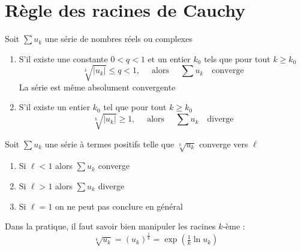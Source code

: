 \section{Règle des racines de Cauchy}

\begin{frame}
\begin{theoreme}
\pause
Soit $\sum u_k$ une série de nombres réels ou complexes
\begin{enumerate}
\item\pause S'il existe une constante $0<q<1$ et un entier $k_0$ tels que pour tout
$k \ge k_0$
$$
\sqrt[k]{|u_k|} \le q <1,\quad \text{ alors }\quad\sum u_k\quad \text{converge}
$$
\pause
La série est même absolument convergente
\item\pause S'il existe un entier $k_0$ tel que pour tout $k \ge k_0$
$$
\sqrt[k]{|u_k|} \ge 1,\quad \text{ alors }\quad\sum u_k \quad\text{diverge}
$$
\end{enumerate}
\end{theoreme}
\end{frame}


\begin{frame}

\begin{corollaire}
\pause
Soit $\sum u_k$ une série à termes positifs telle que 
$\sqrt[k]{u_k}$ converge vers $\ell$
\medskip
\begin{enumerate}
\item\pause Si $\ell<1$ alors $\sum u_k$ converge
\medskip
\item\pause Si $\ell>1$ alors $\sum u_k$ diverge
\medskip
\item\pause Si $\ell=1$ on ne peut pas conclure en général
\end{enumerate}
\end{corollaire}

\bigskip

\pause
Dans la pratique, il faut savoir bien manipuler les racines $k$-ème : 
$$\sqrt[k]{u_k} = (u_k)^{\frac1k} = \exp\left(\tfrac1k \ln u_k\right)$$
\end{frame}




